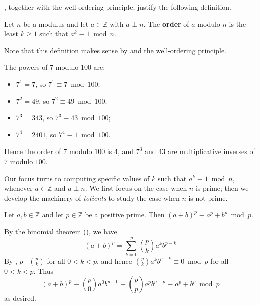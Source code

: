 , together with the well-ordering principle, justify the following definition.

\begin{definition}
\label{defOrderModularArithmetic}
Let $n$ be a modulus and let $a \in \mathbb{Z}$ with $a \perp n$. The \textbf{order} of $a$ modulo $n$ is the least $k \ge 1$ such that $a^k \equiv 1 \bmod n$.
\end{definition}

Note that this definition makes sense by  and the well-ordering principle.

\begin{example}
The powers of $7$ modulo $100$ are:
\begin{itemize}
\item $7^1 = 7$, so $7^1 \equiv 7 \bmod 100$;
\item $7^2 = 49$, so $7^2 \equiv 49 \bmod 100$;
\item $7^3 = 343$, so $7^3 \equiv 43 \bmod 100$;
\item $7^4 = 2401$, so $7^4 \equiv 1 \bmod 100$.
\end{itemize}
Hence the order of $7$ modulo $100$ is $4$, and $7^3$ and $43$ are multiplicative inverses of $7$ modulo $100$.
\end{example}

Our focus turns to computing specific values of $k$ such that $a^k \equiv 1 \bmod n$, whenever $a \in \mathbb{Z}$ and $a \perp n$. We first focus on the case when $n$ is prime; then we develop the machinery of \textit{totients} to study the case when $n$ is not prime.

\begin{lemma} \label{lemBinomPrimeExponent}
Let $a,b \in \mathbb{Z}$ and let $p \in \mathbb{Z}$ be a positive prime. Then $(a+b)^p \equiv a^p+b^p \bmod p$.
\end{lemma}
\begin{cproof}
By the binomial theorem (), we have
\[ (a+b)^p = \sum_{k=0}^p \binom{p}{k} a^kb^{p-k} \]
By , $p \mid \binom{p}{k}$ for all $0 < k < p$, and hence $\binom{p}{k} a^k b^{p-k} \equiv 0 \bmod p$ for all $0 < k < p$. Thus
\[ (a+b)^p \equiv \binom{p}{0}a^0b^{p-0} + \binom{p}{p}a^pb^{p-p} \equiv a^p+b^p \bmod p \]
as desired.
\end{cproof}

